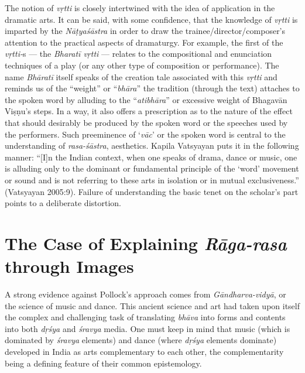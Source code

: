 The notion of \textsl{vṛtti} is closely intertwined with the idea of application in the dramatic arts. It can be said, with some confidence, that the knowledge of \textsl{vṛtti} is imparted by the \textsl{Nāṭyaśāstra} in order to draw the trainee/director/composer’s attention to the practical aspects of dramaturgy. For example, the first of the \textsl{vṛtti-}s --- the \textsl{Bharatī vṛtti} --- relates to the compositional and enunciation techniques of a play (or any other type of composition or performance). The name \textsl{Bhāratī} itself speaks of the creation tale associated with this \textsl{vṛtti} and reminds us of the “weight” or “\textsl{bhāra}” the tradition (through the text) attaches to the spoken word by alluding to the “\textsl{atibhāra}” or excessive weight of Bhagavān Viṣṇu’s steps. In a way, it also offers a prescription as to the nature of the effect that should desirably be produced by the spoken word or the speeches used by the performers. Such preeminence of ‘\textsl{vāc}’ or the spoken word is central to the understanding of \textsl{rasa-śāstra}, aesthetics. Kapila Vatsyayan puts it in the following manner: “[I]n the Indian context, when one speaks of drama, dance or music, one is alluding only to the dominant or fundamental principle of the ‘word’ movement or sound and is not referring to these arts in isolation or in mutual exclusiveness.” (Vatsyayan 2005:9). Failure of understanding the basic tenet on the scholar’s part points to a deliberate distortion.\\[-21pt]       

\section*{The Case of Explaining \textsl{Rāga-rasa} through Images}

A strong evidence against Pollock's approach comes from \textsl{Gāndharva-vidyā}, or the science of music and dance. This ancient science and art had taken upon itself the complex and challenging task of translating \textsl{bhāva} into forms and contents into both \textsl{dṛśya} and \textsl{śravya} media. One must keep in mind that music (which is dominated by \textsl{śravya} elements) and dance (where \textsl{dṛśya} elements dominate) developed in India as arts complementary to each other, the complementarity being a defining feature of their common epistemology. 


